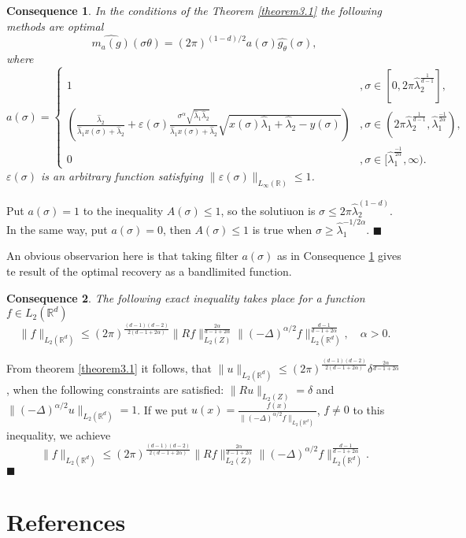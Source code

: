 \documentclass[12pt]{iopart}
\newtheorem{conseq}{Consequence}
\newenvironment{proof}
{\par\noindent{\bf Proof}}
{\hfill$\scriptstyle\blacksquare$}
\begin{document}
\begin{conseq}
\label{cons3.1}
In the conditions of the Theorem \ref{theorem3.1} the following methods are optimal $$
\widehat{m_a(g)}(\sigma\theta
)=(2\pi)^{(1-d)/2}a(\sigma)\widehat{g_\theta }(\sigma), $$ where
  \[
a(\sigma)=
  \begin{cases}
    1& ,\sigma\in [0,2\pi\widehat\lambda_2^\frac{1}{d-1}],\\
    \left(\frac{\widehat\lambda_2}{\widehat\lambda_1x(\sigma)+\widehat\lambda_2}+\varepsilon(\sigma)\frac{\sigma^\alpha\sqrt{\widehat\lambda_1\widehat\lambda_2}}{\widehat\lambda_1x(\sigma)+\widehat\lambda_2}\sqrt{x(\sigma)\widehat\lambda_1+\widehat\lambda_2-y(\sigma)}\right)& ,\sigma\in (2\pi\widehat\lambda_2^\frac{1}{d-1},\widehat\lambda_1^{\frac{-1}{2\alpha}}),\\
    0 &,\sigma\in [\widehat\lambda_1^{\frac{-1}{2\alpha}},\infty).
  \end{cases}
\]
$\varepsilon(\sigma)$ is an arbitrary function satisfying $\|\varepsilon(\sigma)\|_{L_\infty(\mathbb R)}\le 1$.
\end{conseq}

\begin{proof}
Put $a(\sigma)=1$ to the inequality $A(\sigma)\leqslant 1$, so the solutiuon is $\sigma\leqslant
  2\pi\widehat\lambda_2^{(1-d)}$. In the same way, put $a(\sigma)=0$,
  then $A(\sigma)\leqslant 1$ is true when $\sigma\geqslant
  \widehat\lambda_1^{-1/{2\alpha}}$.
\end{proof}

An obvious observarion here is that taking filter $a(\sigma)$ as in Consequence \ref{cons3.1} gives te result of the optimal recovery as a bandlimited function.


\begin{conseq}
\label{cons3.2}
The following exact inequality takes place for a function $f\in L_2(\mathbb R^d)$
\[
\|f\|_{L_2(\mathbb R^d)}\leqslant
(2\pi)^{\frac{(d-1)(d-2)}{2(d-1+2\alpha)}}\|Rf\|_{L_2(Z)}^{\frac{2\alpha}{d-1+2\alpha}}\|(-\Delta)^{\alpha/2}f\|_{L_2(\mathbb
  R^d)}^\frac{d-1}{d-1+2\alpha},\quad\alpha>0.
\]
\end{conseq}

\begin{proof}
From theorem \ref{theorem3.1} it follows, that \linebreak
 $\|u\|_{L_2(\mathbb R^d)}\leqslant
  (2\pi)^{\frac{(d-1)(d-2)}{2(d-1+2\alpha)}}\delta^{\frac{2\alpha}{d-1+2\alpha}}$, 
  when the following constraints are satisfied: $\|Ru\|_{L_2(Z)}=\delta$ and
  $\|(-\Delta)^{\alpha/2}u\|_{L_2(\mathbb R^d)}=1$. If we put
 $u(x)=\frac{f(x)}{\|(-\Delta)^{\alpha/2}f\|_{L_2(\mathbb R^d)}}$, $f\ne 0$ to this inequality, we achieve
\[
\|f\|_{L_2(\mathbb R^d)}\leqslant
(2\pi)^{\frac{(d-1)(d-2)}{2(d-1+2\alpha)}}\|Rf\|_{L_2(Z)}^{\frac{2\alpha}{d-1+2\alpha}}\|(-\Delta)^{\alpha/2}f\|_{L_2(\mathbb
  R^d)}^\frac{d-1}{d-1+2\alpha}.
\]
\end{proof}



\section*{References}


\end{document}
